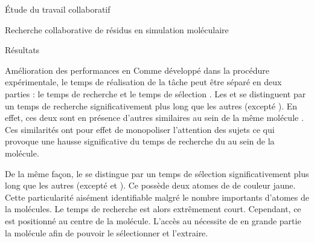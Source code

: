 \documentclass[myfrancais]{mythesis}
\begin{document}
\begin{mypart}{Étude du travail collaboratif}
\begin{mychapter}{Recherche collaborative de résidus en simulation moléculaire}
\begin{mysection}{Résultats}
\begin{mysubsection}{Amélioration des performances en }
					Comme développé dans la procédure expérimentale, le temps de réalisation de la tâche peut être séparé en deux parties : le temps de recherche et le temps de sélection .
					Les   et  se distinguent par un temps de recherche significativement plus long que les autres  (excepté ).
					En effet, ces deux  sont en présence d'autres  similaires au sein de la même molécule .
					Ces similarités ont pour effet de monopoliser l'attention des sujets ce qui provoque une hausse significative du temps de recherche du  au sein de la molécule.

					De la même façon, le   se distingue par un temps de sélection significativement plus long que les autres  (excepté  et ).
					Ce  possède deux atomes de  de couleur jaune.
					Cette particularité aisément identifiable malgré le nombre importants d'atomes de la molécules.
					Le temps de recherche est alors extrêmement court.
					Cependant, ce  est positionné au centre de la molécule.
					L'accès au  nécessite de  en grande partie la molécule afin de pouvoir le sélectionner et l'extraire.


\end{mysubsection}
\end{mysection}
\end{mychapter}
\end{mypart}
\end{document}
